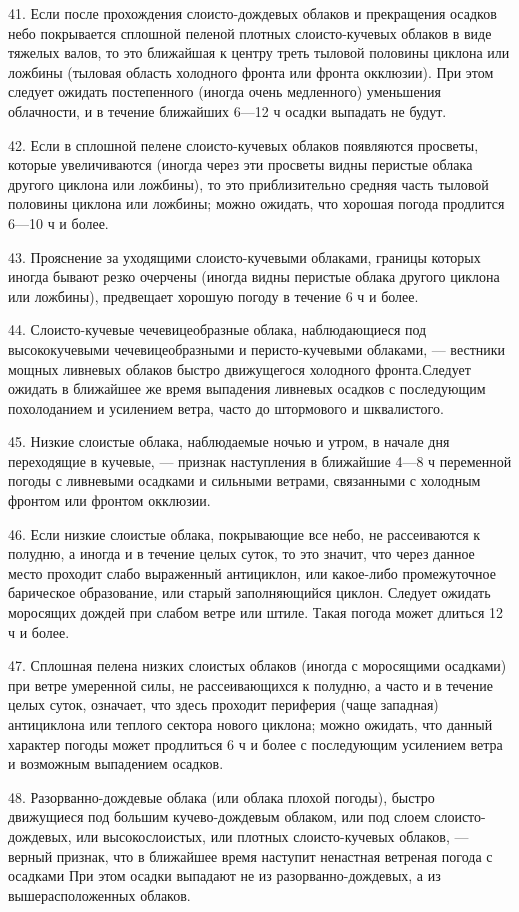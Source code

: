 41. Если после прохождения слоисто-дождевых облаков и прекращения осадков небо покрывается сплошной пеленой плотных слоисто-кучевых облаков в виде тяжелых валов, то это ближайшая к центру треть тыловой половины циклона или ложбины (тыловая область холодного фронта или фронта окклюзии). При этом следует ожидать постепенного (иногда очень медленного) уменьшения облачности, и в течение ближайших 6—12 ч осадки выпадать не будут.

42. Если в сплошной пелене слоисто-кучевых облаков появляются просветы, которые увеличиваются (иногда через эти просветы видны перистые облака другого циклона или ложбины), то это приблизительно средняя часть тыловой половины циклона или ложбины; можно ожидать, что хорошая погода продлится 6—10 ч и более.

43. Прояснение за уходящими слоисто-кучевыми облаками, границы которых иногда бывают резко очерчены (иногда видны перистые облака другого циклона или ложбины), предвещает хорошую погоду в течение 6 ч и более.

44. Слоисто-кучевые чечевицеобразные облака, наблюдающиеся под высококучевыми чечевицеобразными и перисто-кучевыми облаками, — вестники мощных ливневых облаков быстро движущегося холодного фронта.Следует ожидать в ближайшее же время выпадения ливневых осадков с последующим похолоданием и усилением ветра, часто до штормового и шквалистого.

45. Низкие слоистые облака, наблюдаемые ночью и утром, в начале дня переходящие в кучевые, — признак наступления в ближайшие 4—8 ч переменной погоды с ливневыми осадками и сильными ветрами, связанными с холодным фронтом или фронтом окклюзии.

46. Если низкие слоистые облака, покрывающие все небо, не рассеиваются к полудню, а иногда и в течение целых суток, то это значит, что через данное место проходит слабо выраженный антициклон, или какое-либо промежуточное барическое образование, или старый заполняющийся циклон. Следует ожидать моросящих дождей при слабом ветре или штиле. Такая погода может длиться 12 ч и более.

47. Сплошная пелена низких слоистых облаков (иногда с моросящими осадками) при ветре умеренной силы, не рассеивающихся к полудню, а часто и в течение целых суток, означает, что здесь проходит периферия (чаще западная) антициклона или теплого сектора нового циклона; можно ожидать, что данный характер погоды может продлиться 6 ч и более с последующим усилением ветра и возможным выпадением осадков.

48. Разорванно-дождевые облака (или облака плохой погоды), быстро движущиеся под большим кучево-дождевым облаком, или под слоем слоисто-дождевых, или высокослоистых, или плотных слоисто-кучевых облаков, — верный признак, что в ближайшее время наступит ненастная ветреная погода с осадками При этом осадки выпадают не из разорванно-дождевых, а из вышерасположенных облаков.

